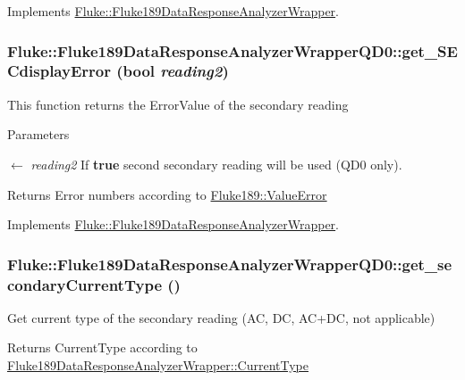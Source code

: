 Implements \hyperlink{classFluke_1_1Fluke189DataResponseAnalyzerWrapper_a81fd0f497095dba37f2a614bd35426db}{Fluke::Fluke189DataResponseAnalyzerWrapper}.\hypertarget{classFluke_1_1Fluke189DataResponseAnalyzerWrapperQD0_a72e91f8c908b7fa8ce541308a53ff696}{
\subsubsection[{get\_\-SECdisplayError}]{ Fluke::Fluke189DataResponseAnalyzerWrapperQD0::get\_\-SECdisplayError (bool {\em reading2})}}
\label{classFluke_1_1Fluke189DataResponseAnalyzerWrapperQD0_a72e91f8c908b7fa8ce541308a53ff696}
This function returns the ErrorValue of the secondary reading 
\begin{DoxyParams}{Parameters}
\item[\mbox{$\leftarrow$} {\em reading2}]If {\bfseries true} second secondary reading will be used (QD0 only). \end{DoxyParams}
\begin{DoxyReturn}{Returns}
Error numbers according to \hyperlink{classFluke_1_1Fluke189_a5dc0eaffde0a29a64cbcbd50d4178491}{Fluke189::ValueError} 
\end{DoxyReturn}


Implements \hyperlink{classFluke_1_1Fluke189DataResponseAnalyzerWrapper_aaf53f3e129ae21be4abe85bf4998fed5}{Fluke::Fluke189DataResponseAnalyzerWrapper}.\hypertarget{classFluke_1_1Fluke189DataResponseAnalyzerWrapperQD0_aa46ac22750b412df37ae24db84fab138}{
\subsubsection[{get\_\-secondaryCurrentType}]{ Fluke::Fluke189DataResponseAnalyzerWrapperQD0::get\_\-secondaryCurrentType ()}}
\label{classFluke_1_1Fluke189DataResponseAnalyzerWrapperQD0_aa46ac22750b412df37ae24db84fab138}
Get current type of the secondary reading (AC, DC, AC+DC, not applicable) \begin{DoxyReturn}{Returns}
CurrentType according to \hyperlink{classFluke_1_1Fluke189DataResponseAnalyzerWrapper_afef24496da239e3613c40ad3582d7adc}{Fluke189DataResponseAnalyzerWrapper::CurrentType} 
\end{DoxyReturn}


